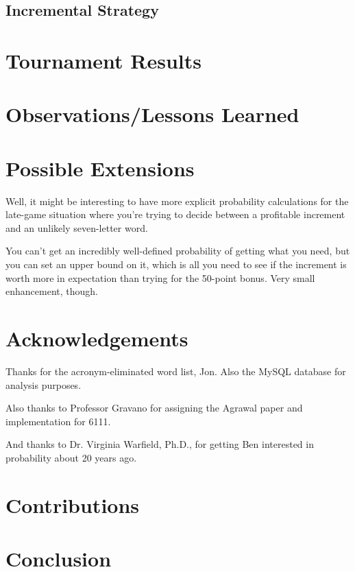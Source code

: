 \documentclass[11pt]{article}
\begin{document}
\subsection{Incremental Strategy}

\section{Tournament Results} %

\section{Observations/Lessons Learned}

\section{Possible Extensions}

Well, it might be interesting to have more explicit probability calculations for the late-game situation where you're trying to decide between a profitable increment and an unlikely seven-letter word.

You can't get an incredibly well-defined probability of getting what you need, but you can set an upper bound on it, which is all you need to see if the increment is worth more in expectation than trying for the 50-point bonus.  Very small enhancement, though.



\section{Acknowledgements}

Thanks for the acronym-eliminated word list, Jon.  Also the MySQL database for analysis purposes.

Also thanks to Professor Gravano for assigning the Agrawal paper and implementation for 6111.

And thanks to Dr. Virginia Warfield, Ph.D., for getting Ben interested in probability about 20 years ago.

\section{Contributions}



\section{Conclusion}
\end{document}
